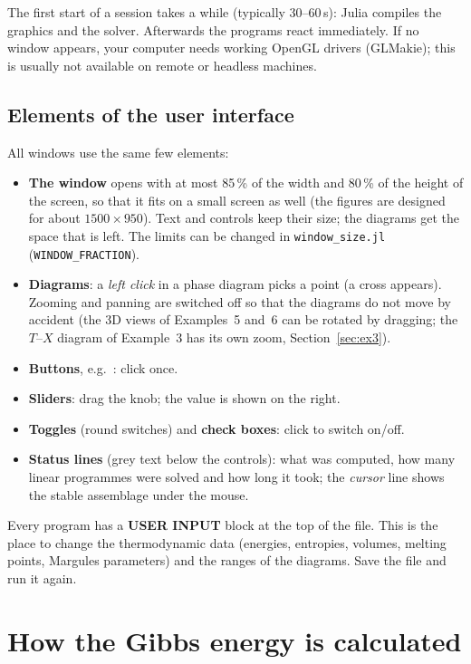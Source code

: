 \documentclass[11pt,a4paper]{article}
\newcommand{\btn}[1]{\fbox{\small\textsf{#1}}}                 %
\newcommand{\file}[1]{\texttt{#1}}
\begin{document}
\begin{note}
The first start of a session takes a while (typically 30–60\,s): Julia compiles the graphics and the solver.
Afterwards the programs react immediately. If no window appears, your computer needs working OpenGL drivers
(GLMakie); this is usually not available on remote or headless machines.
\end{note}

\subsection{Elements of the user interface}
All windows use the same few elements:
\begin{itemize}
\item \textbf{The window} opens with at most 85\,\% of the width and 80\,\% of the height of the screen, so
  that it fits on a small screen as well (the figures are designed for about $1500 \times 950$). Text and
  controls keep their size; the diagrams get the space that is left. The limits can be changed in
  \file{window\_size.jl} (\lstinline{WINDOW_FRACTION}).
\item \textbf{Diagrams}: a \emph{left click} in a phase diagram picks a point (a cross appears). Zooming and
  panning are switched off so that the diagrams do not move by accident (the 3D views of Examples~5 and~6
  can be rotated by dragging; the $T$–$X$ diagram of Example~3 has its own zoom, Section~\ref{sec:ex3}).
\item \textbf{Buttons}, e.g.\ \btn{Compute g–x}: click once.
\item \textbf{Sliders}: drag the knob; the value is shown on the right.
\item \textbf{Toggles} (round switches) and \textbf{check boxes}: click to switch on/off.
\item \textbf{Status lines} (grey text below the controls): what was computed, how many linear programmes were
  solved and how long it took; the \emph{cursor} line shows the stable assemblage under the mouse.
\end{itemize}
Every program has a \textbf{USER INPUT} block at the top of the file. This is the place to change the
thermodynamic data (energies, entropies, volumes, melting points, Margules parameters) and the ranges of the
diagrams. Save the file and run it again.

\section{How the Gibbs energy is calculated}\label{sec:gibbs}
\end{document}
